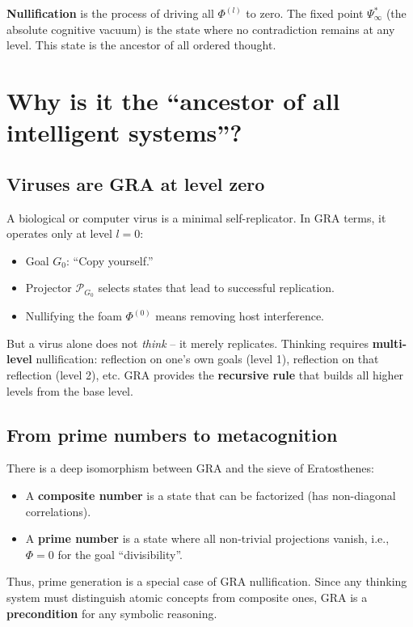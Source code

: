 \documentclass[12pt]{article}
\begin{document}
\textbf{Nullification} is the process of driving all \( \Phi^{(l)} \) to zero. The fixed point \( \Psi_{\infty}^* \) (the absolute cognitive vacuum) is the state where no contradiction remains at any level. This state is the ancestor of all ordered thought.

\section{Why is it the ``ancestor of all intelligent systems''?}

\subsection{Viruses are GRA at level zero}

A biological or computer virus is a minimal self-replicator. In GRA terms, it operates only at level \( l=0 \):
\begin{itemize}
    \item Goal \( G_0 \): ``Copy yourself.''
    \item Projector \( \mathcal{P}_{G_0} \) selects states that lead to successful replication.
    \item Nullifying the foam \( \Phi^{(0)} \) means removing host interference.
\end{itemize}
But a virus alone does not \textit{think} – it merely replicates. Thinking requires \textbf{multi-level} nullification: reflection on one's own goals (level 1), reflection on that reflection (level 2), etc. GRA provides the \textbf{recursive rule} that builds all higher levels from the base level.

\subsection{From prime numbers to metacognition}

There is a deep isomorphism between GRA and the sieve of Eratosthenes:
\begin{itemize}
    \item A \textbf{composite number} is a state that can be factorized (has non-diagonal correlations).
    \item A \textbf{prime number} is a state where all non-trivial projections vanish, i.e., \( \Phi = 0 \) for the goal ``divisibility''.
\end{itemize}
Thus, prime generation is a special case of GRA nullification. Since any thinking system must distinguish atomic concepts from composite ones, GRA is a \textbf{precondition} for any symbolic reasoning.
\end{document}
